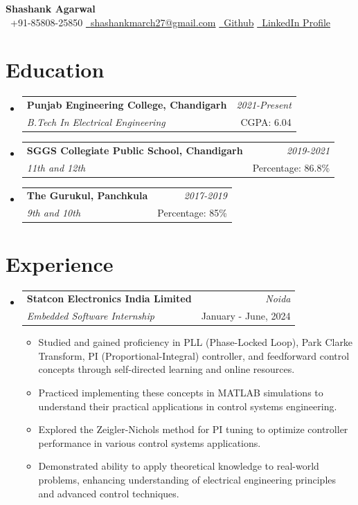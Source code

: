 \documentclass[a4paper,11pt]{article}
\makeatletter
\newcommand{\resumeSubheading}[4]{
\vspace{0.5mm}\item
    \begin{tabular*}{0.98\textwidth}[t]{l@{\extracolsep{\fill}}r}
        \textbf{#1} & \textit{\footnotesize{#4}} \\
        \textit{\footnotesize{#3}} &  \footnotesize{#2}\\
    \end{tabular*}
    \vspace{-2.4mm}
}
\newcommand{\resumeSubHeadingListStart}{\begin{itemize}[leftmargin=*,labelsep=0mm]}
\newcommand{\resumeItemListStart}{\begin{justify}\begin{itemize}[leftmargin=3ex, rightmargin=2ex, noitemsep,labelsep=1.2mm,itemsep=0mm]\small}
\newcommand{\resumeSubHeadingListEnd}{\end{itemize}\vspace{2mm}}
\newcommand{\resumeItemListEnd}{\end{itemize}\end{justify}\vspace{-2mm}}
\newcommand{\name}{Shashank Agarwal} %
\newcommand{\phone}{85808-25850} %
\newcommand{\emaila}{shashankmarch27@gmail.com} %
\makeatother
\begin{document}
\selectfont

\textbf{\huge \name} \\
\vspace{1mm}
{\raisebox{0.0\height}{\footnotesize \faPhone}\ +91-\phone} \hspace{8mm}
\href{mailto:\emaila}{\raisebox{0.0\height}{\footnotesize \faEnvelope}\ {\emaila}} \hspace{8mm}
\href{https://github.com/Witty-Wizard}{\raisebox{0.0\height}{\footnotesize \faGithub}\ {Github}} \hspace{8mm}
\href{https://www.linkedin.com/in/shashank-agarwal-pio/}{\raisebox{0.0\height}{\footnotesize \faLinkedin}\ {LinkedIn Profile}}
\vspace{-3mm}

\section{\textbf{Education}}
\resumeSubHeadingListStart
\resumeSubheading
{Punjab Engineering College, Chandigarh}{CGPA: 6.04}
{B.Tech In Electrical Engineering}{2021-Present}
\resumeSubheading
{SGGS Collegiate Public School, Chandigarh}{Percentage: 86.8\%}
{11th and 12th}{2019-2021}
\resumeSubheading
{The Gurukul, Panchkula}{Percentage: 85\%}
{9th and 10th}{2017-2019}
\resumeSubHeadingListEnd
\vspace{-5.5mm}
%

\section{\textbf{Experience}}
\resumeSubHeadingListStart
\resumeSubheading
{Statcon Electronics India Limited}{January - June, 2024}
{Embedded Software Internship}{Noida}
\resumeItemListStart
\item{Studied and gained proficiency in PLL (Phase-Locked Loop), Park Clarke Transform, PI (Proportional-Integral) controller, and feedforward control concepts through self-directed learning and online resources.}
\item{Practiced implementing these concepts in MATLAB simulations to understand their practical applications in control systems engineering.}
\item{Explored the Zeigler-Nichols method for PI tuning to optimize controller performance in various control systems applications.}
\item{Demonstrated ability to apply theoretical knowledge to real-world problems, enhancing understanding of electrical engineering principles and advanced control techniques.}
\resumeItemListEnd
\resumeSubHeadingListEnd
\end{document}
